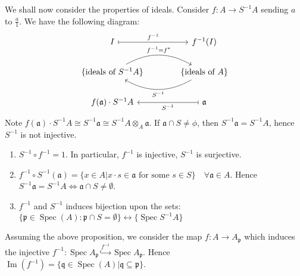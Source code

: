 \documentclass[12pt]{article}
\theoremstyle{definition}
\theoremstyle{plain}
\DeclareMathOperator{\im}{Im}
\DeclareMathOperator{\Spec}{Spec}
\newcommand{\inj}{\hookrightarrow}
\begin{document}
\medskip
We shall now consider the properties of ideals. Consider $f:A\to S^{-1}A$ sending $a$ to $\frac{a}{1}$. We have the following diagram:
\begin{equation}
  \begin{tikzcd}[column sep=large]
  I \ar[|->]{r}{f^{-1}} & f^{-1}(I)\\
\{\text{ideals of }S^{-1}A\}\ar[bend left]{r}{f^{-1}=f^*} &\{\text{ideals of }A\}\arrow[bend left]{l}{S^{-1}}\\
 f(\mathfrak{a})\cdot S^{-1}A & \mathfrak{a}\ar[|->]{l}{S^{-1}}
  \end{tikzcd}
\end{equation}
Note $f(\mathfrak{a})\cdot S^{-1}A\cong S^{-1}\mathfrak{a}\cong S^{-1}A\otimes_A \mathfrak{a}$.
\Rmk If $\mathfrak{a}\cap S\neq \phi$, then $S^{-1}\mathfrak{a}=S^{-1}A$, hence $S^{-1}$ is not injective.
\Prop \leavevmode
\begin{enumerate}
  \item $S^{-1}\circ f^{-1}=1$. In particular, $f^{-1}$ is injective, $S^{-1}$ is surjective.
  \item $f^{-1}\circ S^{-1}(\mathfrak{a})=\{x\in A|x\cdot s\in \mathfrak{a}\text{ for some }s\in S\} \quad \forall \mathfrak{a}\in A$. Hence $S^{-1}\mathfrak{a}=S^{-1}A \iff \mathfrak{a}\cap S\neq \emptyset$.
  \item $f^{-1}$ and $S^{-1}$ induces bijection upon the sets: $\{\mathfrak{p}\in \Spec(A): \mathfrak{p}\cap S=\emptyset\}\leftrightarrow \{\Spec S^{-1}A\}$
\end{enumerate}
\Rmk Assuming the above proposition, we consider the map $f:A\to A_\mathfrak{p}$ which induces the injective $f^{-1}: \Spec A_\mathfrak{p}\overset{f^{-1}}{\inj}\Spec A_\mathfrak{p}$. Hence $\im(f^{-1})=\{\mathfrak{q}\in \Spec(A)|\mathfrak{q}\subseteq \mathfrak{p}\}$.
\proof \leavevmode
\end{document}

